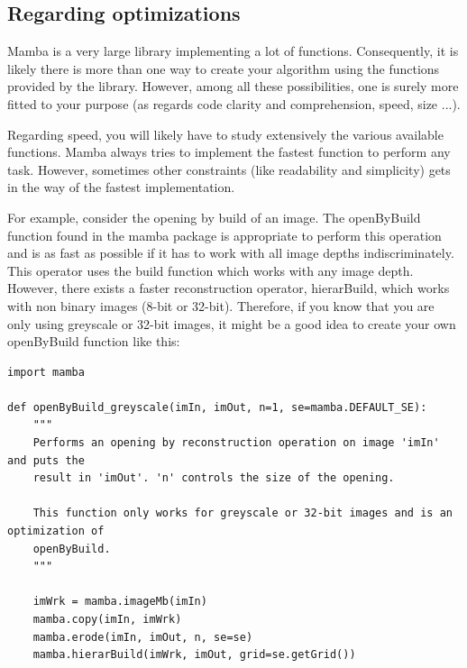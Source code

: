 \documentclass[a4paper,10pt,oneside]{article}
\begin{document}

\subsection{Regarding optimizations}


Mamba is a very large library implementing a lot of functions. Consequently, it
is likely there is more than one way to create your algorithm using the functions
provided by the library. However, among all these possibilities, one is surely more
fitted to your purpose (as regards code clarity and comprehension, speed, size ...).

Regarding speed, you will likely have to study extensively the various
available functions. Mamba always tries to implement the fastest function to 
perform any task. However, sometimes other constraints (like readability and
simplicity) gets in the way of the fastest implementation.

For example, consider the opening by build of an image. The openByBuild function
found in the mamba package is appropriate to perform this operation and
is as fast as possible if it has to work with all image depths indiscriminately.
This operator uses the build function which works with any image
depth. However, there exists a faster reconstruction operator,
hierarBuild, which works with non binary images (8-bit or 32-bit). Therefore, if you
know that you are only using greyscale or 32-bit images, it might be a good idea to create
your own openByBuild function like this:

\lstset{language=Python}
\begin{lstlisting}
import mamba

def openByBuild_greyscale(imIn, imOut, n=1, se=mamba.DEFAULT_SE):
    """
    Performs an opening by reconstruction operation on image 'imIn' and puts the
    result in 'imOut'. 'n' controls the size of the opening.
    
    This function only works for greyscale or 32-bit images and is an optimization of
    openByBuild.
    """
    
    imWrk = mamba.imageMb(imIn)
    mamba.copy(imIn, imWrk)
    mamba.erode(imIn, imOut, n, se=se)
    mamba.hierarBuild(imWrk, imOut, grid=se.getGrid())
\end{lstlisting}
\end{document}
